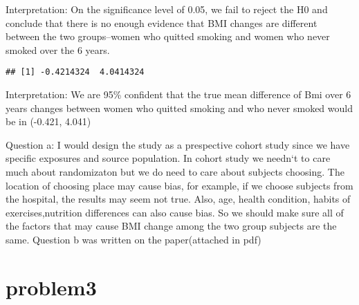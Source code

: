 \documentclass[]{article}
\newenvironment{Shaded}{\begin{snugshade}}{\end{snugshade}}
\newcommand{\KeywordTok}[1]{\textcolor[rgb]{0.13,0.29,0.53}{\textbf{#1}}}
\newcommand{\DecValTok}[1]{\textcolor[rgb]{0.00,0.00,0.81}{#1}}
\newcommand{\FloatTok}[1]{\textcolor[rgb]{0.00,0.00,0.81}{#1}}
\newcommand{\StringTok}[1]{\textcolor[rgb]{0.31,0.60,0.02}{#1}}
\newcommand{\CommentTok}[1]{\textcolor[rgb]{0.56,0.35,0.01}{\textit{#1}}}
\newcommand{\OperatorTok}[1]{\textcolor[rgb]{0.81,0.36,0.00}{\textbf{#1}}}
\newcommand{\NormalTok}[1]{#1}
\begin{document}
Interpretation: On the significance level of 0.05, we fail to reject the
H0 and conclude that there is no enough evidence that BMI changes are
different between the two groups--women who quitted smoking and women
who never smoked over the 6 years.

\begin{Shaded}
\end{Shaded}

\begin{verbatim}
## [1] -0.4214324  4.0414324
\end{verbatim}

Interpretation: We are 95\% confident that the true mean difference of
Bmi over 6 years changes between women who quitted smoking and who never
smoked would be in (-0.421, 4.041)

Question a: I would design the study as a prespective cohort study since
we have specific exposures and source population. In cohort study we
needn`t to care much about randomizaton but we do need to care about
subjects choosing. The location of choosing place may cause bias, for
example, if we choose subjects from the hospital, the results may seem
not true. Also, age, health condition, habits of exercises,nutrition
differences can also cause bias. So we should make sure all of the
factors that may cause BMI change among the two group subjects are the
same. Question b was written on the paper(attached in pdf)

\section{problem3}\label{problem3}
\end{document}

